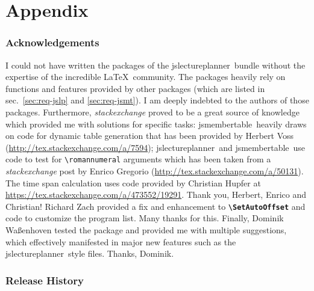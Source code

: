 \documentclass[english]{article}
\newcommand*\jmacro[1]{\textbf{\texttt{#1}}}
\newcommand*\jcsmacro[1]{\jmacro{\textbackslash{#1}}}
\newcommand*\jfmacro[1]{\texttt{#1}}
\newcommand*\jfcsmacro[1]{\jfmacro{\textbackslash{#1}}}
\newcommand*\jslp{\textsf{jslectureplanner}}
\newcommand*\jsmt{\textsf{jsmembertable}}
\begin{document}
\part{Appendix}

\section{Acknowledgements}

I could not have written the packages of the \jslp\ bundle without the expertise of the incredible \LaTeX\
community. The packages heavily rely on functions and features
provided by other packages (which are listed in sec.~\ref{sec:req-jslp} and \ref{sec:req-jsmt}).
I am deeply indebted to the authors of those packages.
Furthermore, \emph{stackexchange} proved to be a great source of knowledge which
provided me with solutions for specific tasks:
\jsmt\ heavily draws on code for dynamic table generation that has been
provided by Herbert Voss (\url{http://tex.stackexchange.com/a/7594}); \jslp\ and \jsmt\
use code to test for \jfcsmacro{romannumeral} arguments which has been taken from
a \emph{stackexchange} post by Enrico Gregorio (\url{http://tex.stackexchange.com/a/50131}).
The time span calculation uses code provided by Christian Hupfer at
\url{https://tex.stackexchange.com/a/473552/19291}.
Thank you, Herbert, Enrico and Christian!
Richard Zach provided a fix and enhancement to \jcsmacro{SetAutoOffset} and code to customize
the program list. Many thanks for this.
Finally, Dominik Waßenhoven tested the package and provided
me with multiple suggestions, which effectively manifested in major new features such as
the \jslp\ style files. Thanks, Dominik.

\section{Release History}
\end{document}
